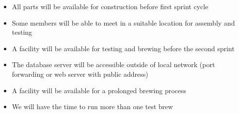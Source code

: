 
\begin{itemize}
  \item All parts will be available for construction before first sprint cycle 
  \item Some members will be able to meet in a suitable location for assembly and testing 
  \item A facility will be available for testing and brewing before the second sprint
  \item The database server will be accessible outside of local network (port forwarding or web server with public address) 
  \item A facility will be available for a prolonged brewing process
  \item We will have the time to run more than one test brew
\end{itemize}
